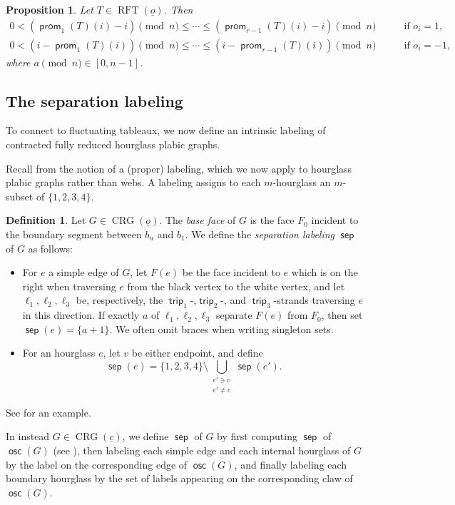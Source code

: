 \documentclass{amsart}
\newtheorem{proposition}[theorem]{Proposition}
\theoremstyle{definition}
\newtheorem{definition}[theorem]{Definition}
\theoremstyle{remark}
\numberwithin{equation}{section}
\DeclareMathOperator{\trip}{\mathsf{trip}}
\DeclareMathOperator{\osc}{\mathsf{osc}}
\DeclareMathOperator{\rft}{RFT}
\DeclareMathOperator{\prom}{\mathsf{prom}}
\DeclareMathOperator{\sep}{\mathsf{sep}}
\DeclareMathOperator{\crg}{CRG}
\begin{document}
\begin{proposition}\label{prop:prom-cyclically-monotonic}
    Let $T \in \rft(\underline{o})$. Then
    \begin{align*}
      0 < (\prom_1(T)(i) - i)\pmod{n} \leq \cdots \leq (\prom_{r-1}(T)(i) - i)\pmod{n} \qquad&\text{if }o_i = 1, \\
      0 < (i - \prom_1(T)(i))\pmod{n} \leq \cdots \leq (i - \prom_{r-1}(T)(i))\pmod{n} \qquad&\text{if }o_i = -1,
    \end{align*}
    where $a \pmod{n} \in [0, n-1]$.
\end{proposition}

\subsection{The separation labeling}\label{sec:sep_labeling}
To connect to fluctuating tableaux, we now define an intrinsic labeling of contracted fully reduced hourglass plabic graphs.

Recall from  the notion of a (proper) labeling, which we now apply to hourglass plabic graphs rather than webs. A labeling assigns to each $m$-hourglass an $m$-subset of $\{1,2,3,4\}$.


\begin{definition}
\label{def:separation-labeling}
Let $G \in \crg(\underline{o})$. The \emph{base face} of $G$ is the face $F_0$ incident to the boundary segment between $b_n$ and $b_1$. We define the \emph{separation labeling} $\sep$ of $G$ as follows:
\begin{itemize}
    \item For $e$ a simple edge of $G$, let $F(e)$ be the face incident to $e$ which is on the right when traversing $e$ from the black vertex to the white vertex, and let $\ell_1,\ell_2,\ell_3$ be, respectively, the $\trip_1$-,$\trip_2$-, and $\trip_3$-strands traversing $e$ in this direction. If exactly $a$ of $\ell_1,\ell_2,\ell_3$ separate $F(e)$ from $F_0$, then set $\sep(e)=\{a+1\}$. We often omit braces when writing singleton sets. 
    \item For an  hourglass $e$, let $v$ be either endpoint, and define
\begin{equation}\label{eq:sep-label-for-hourglass}
\sep(e) = \{1,2,3,4\} \setminus \bigcup_{\substack{e' \ni v \\ e' \neq e}} \sep(e').
\end{equation}
\end{itemize}
See  for an example.

In instead $G \in \crg(\underline{c})$, we define $\sep$ of $G$ by first computing $\sep$ of $\osc(G)$ (see ), then labeling each simple edge and each internal hourglass of $G$ by the label on the corresponding edge of $\osc(G)$, and finally labeling each boundary hourglass by the set of labels appearing on the corresponding claw of $\osc(G)$.
\end{definition}
\end{document}
